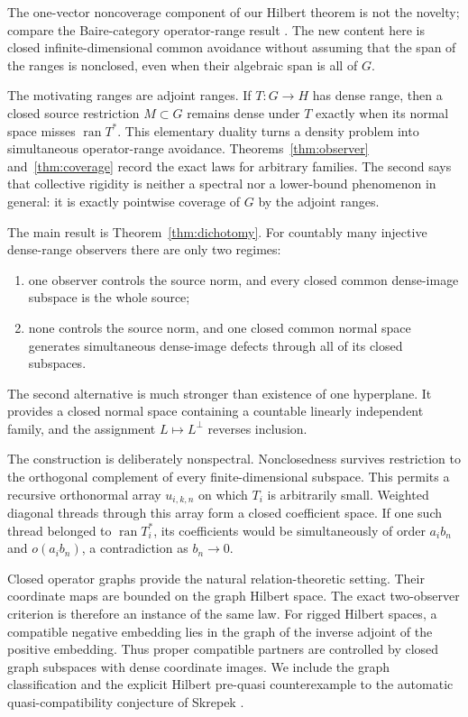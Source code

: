 \documentclass[11pt]{article}
\newcommand{\ran}{\operatorname{ran}}
\begin{document}
The one-vector noncoverage component of our Hilbert theorem is not the
novelty; compare the Baire-category operator-range result
\cite[Proposition~2.6]{AroraGlueck2023}.  The new content here is
closed infinite-dimensional common avoidance without assuming that the span
of the ranges is nonclosed, even when their algebraic span is all of \(G\).

The motivating ranges are adjoint ranges.  If \(T:G\to H\) has dense range,
then a closed source restriction \(M\subset G\) remains dense under \(T\)
exactly when its normal space misses \(\ran T^*\).  This elementary duality
turns a density problem into simultaneous operator-range avoidance.
Theorems~\ref{thm:observer} and~\ref{thm:coverage} record the exact laws for
arbitrary families.  The second says that collective rigidity is neither a
spectral nor a lower-bound phenomenon in general: it is exactly pointwise
coverage of \(G\) by the adjoint ranges.

The main result is Theorem~\ref{thm:dichotomy}.  For countably many injective
dense-range observers there are only two regimes:
\begin{enumerate}[label=(\roman*)]
  \item one observer controls the source norm, and every closed common
  dense-image subspace is the whole source;
  \item none controls the source norm, and one closed common normal space
  generates simultaneous dense-image defects through all of its closed
  subspaces.
\end{enumerate}
The second alternative is much stronger than existence of one hyperplane.
It provides a closed normal space containing a countable linearly independent
family, and the assignment \(L\mapsto L^\perp\) reverses inclusion.

The construction is deliberately nonspectral.  Nonclosedness survives
restriction to the orthogonal complement of every finite-dimensional
subspace.  This permits a recursive orthonormal array
\(u_{i,k,n}\) on which \(T_i\) is arbitrarily small.  Weighted diagonal
threads through this array form a closed coefficient space.  If one such
thread belonged to \(\ran T_i^*\), its coefficients would be simultaneously
of order \(a_i b_n\) and \(o(a_i b_n)\), a contradiction as \(b_n\to0\).

Closed operator graphs provide the natural relation-theoretic setting.
Their coordinate maps are bounded on the graph Hilbert space.  The exact
two-observer criterion is therefore an instance of the same law.  For rigged
Hilbert spaces, a compatible negative embedding lies in the graph of the
inverse adjoint of the positive embedding.  Thus proper compatible partners
are controlled by closed graph subspaces with dense coordinate images.
We include the graph classification and the explicit Hilbert
pre-quasi counterexample to the automatic quasi-compatibility conjecture of
Skrepek \cite{Skrepek2025}.
\end{document}
